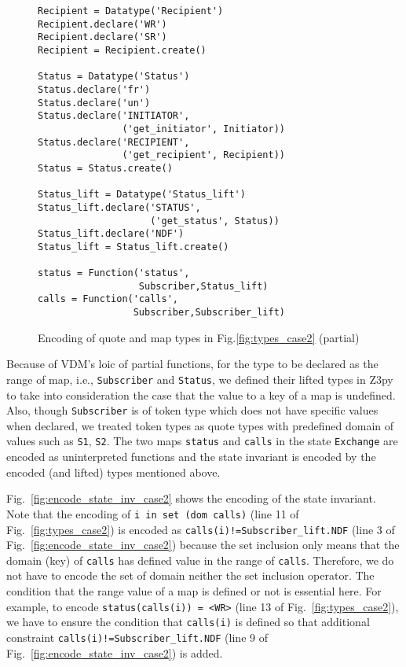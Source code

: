\begin{figure}[t]
\begin{center}
\begin{mdframed}[roundcorner=5pt,shadow=true]
\begin{Verbatim}[fontsize=\small]
Recipient = Datatype('Recipient')
Recipient.declare('WR')
Recipient.declare('SR')
Recipient = Recipient.create()

Status = Datatype('Status')
Status.declare('fr')
Status.declare('un')
Status.declare('INITIATOR',
               ('get_initiator', Initiator))
Status.declare('RECIPIENT',
               ('get_recipient', Recipient))
Status = Status.create()

Status_lift = Datatype('Status_lift')
Status_lift.declare('STATUS',
                    ('get_status', Status))
Status_lift.declare('NDF')
Status_lift = Status_lift.create()

status = Function('status',
                  Subscriber,Status_lift)
calls = Function('calls',
                 Subscriber,Subscriber_lift)
\end{Verbatim}
\end{mdframed}
\vspace{-10pt}
\caption{Encoding of quote and map types in Fig.\ref{fig:types_case2} (partial)}
\label{fig:encode_types_case2}
\end{center}
\vspace{-20pt}
\end{figure}

Because of VDM's loic of partial functions, for the type to be declared as the range of map, i.e., {\tt Subscriber} and {\tt Status}, we defined their lifted types in Z3py to take into consideration the case that the value to a key of a map is undefined. Also, though {\tt Subscriber} is of token type which does not have specific values when declared, we treated token types as quote types with predefined domain of values such as {\tt S1}, {\tt S2}. The two maps {\tt status} and {\tt calls} in the state {\tt Exchange} are encoded as uninterpreted functions and the state invariant is encoded by the encoded (and lifted) types mentioned above. 

Fig.~\ref{fig:encode_state_inv_case2} shows the encoding of the state invariant. Note that the encoding of {\tt i in set (dom calls)} (line 11 of Fig.~\ref{fig:types_case2}) is encoded as {\tt calls(i)!=Subscriber\_lift.NDF} (line 3 of Fig.~\ref{fig:encode_state_inv_case2}) because the set inclusion only means that the domain (key) of {\tt calls} has defined value in the range of {\tt calls}. Therefore, we do not have to encode the set of domain neither the set inclusion operator. The condition that the range value of a map is defined or not is essential here. For example, to encode {\tt status(calls(i)) = <WR>} (line 13 of Fig.~\ref{fig:types_case2}), we have to ensure the condition that {\tt calls(i)} is defined so that additional constraint {\tt calls(i)!=Subscriber\_lift.NDF} (line 9 of Fig.~\ref{fig:encode_state_inv_case2}) is added.

